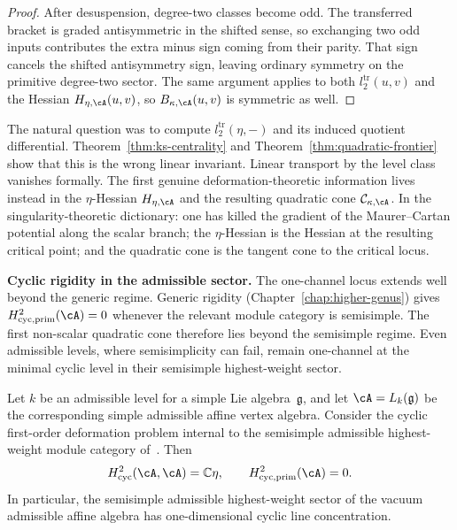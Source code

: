 \begin{proof}
After desuspension, degree-two classes become odd.
The transferred bracket is graded antisymmetric in the shifted sense,
so exchanging two odd inputs contributes the extra minus sign coming
from their parity.
That sign cancels the shifted antisymmetry sign, leaving ordinary
symmetry on the primitive degree-two sector.
The same argument applies to both
$l_2^{\mathrm{tr}}(u,v)$ and the Hessian $H_{\eta,\cA}(u,v)$, so
$B_{\kappa,\cA}(u,v)$ is symmetric as well.
\end{proof}

\begin{remark}
\label{rem:frontier-moved}
The natural question was to compute $l_2^{\mathrm{tr}}(\eta, -)$ and
its induced quotient differential.
Theorem~\ref{thm:ks-centrality} and
Theorem~\ref{thm:quadratic-frontier} show that this is the wrong
linear invariant. Linear transport by the level class vanishes formally. The
first genuine deformation-theoretic information lives instead in the
$\eta$-Hessian $H_{\eta,\cA}$ and the resulting quadratic cone
$\mathcal{C}_{\kappa,\cA}$. In the singularity-theoretic dictionary:
one has killed the gradient of the Maurer--Cartan potential along the
scalar branch; the $\eta$-Hessian is the Hessian at the resulting
critical point; and the quadratic cone is the tangent cone to the
critical locus.
\end{remark}

\medskip

\noindent\textbf{Cyclic rigidity in the admissible sector.}\enspace
The one-channel locus extends well beyond the generic regime. Generic
rigidity (Chapter~\ref{chap:higher-genus}) gives
$H^2_{\mathrm{cyc,prim}}(\cA) = 0$ whenever the relevant module
category is semisimple. The first non-scalar quadratic cone therefore
lies beyond the semisimple regime. Even admissible levels, where
semisimplicity can fail, remain one-channel at the minimal
cyclic level in their semisimple highest-weight sector.

\begin{theorem}
\label{thm:admissible-scalar-rigidity}
Let $k$ be an admissible level for a simple Lie algebra~$\mathfrak{g}$,
and let $\cA = L_k(\mathfrak{g})$ be the corresponding simple admissible
affine vertex algebra. Consider the cyclic first-order deformation
problem internal to the semisimple admissible highest-weight module
category of~\cite{Arakawa2016RationalAdmissible}. Then
\[
H^2_{\mathrm{cyc}}(\cA, \cA) = \mathbb{C}\eta,
\qquad
H^2_{\mathrm{cyc,prim}}(\cA) = 0.
\]
In particular, the semisimple admissible highest-weight sector of the
vacuum admissible affine algebra has one-dimensional cyclic
line concentration.
\end{theorem}

